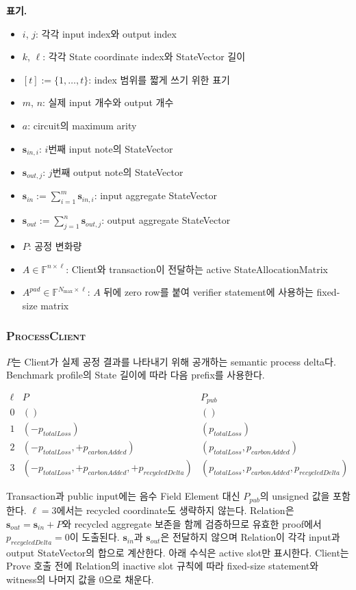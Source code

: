 \documentclass[11pt,a4paper]{extarticle}
\newcommand{\Prove}{\mathrm{Prove}}
\begin{document}
\noindent\textbf{표기.}
\begin{itemize}[nosep]
  \item $i$, $j$: 각각 input index와 output index
  \item $k$, $\ell$: 각각 State coordinate index와 StateVector 길이
  \item $[t]:=\{1,\ldots,t\}$: index 범위를 짧게 쓰기 위한 표기
  \item $m$, $n$: 실제 input 개수와 output 개수
  \item $a$: circuit의 maximum arity
  \item $\mathbf{s}_{in,i}$: $i$번째 input note의 StateVector
  \item $\mathbf{s}_{out,j}$: $j$번째 output note의 StateVector
  \item $\mathbf{s}_{in}:=\sum_{i=1}^{m}\mathbf{s}_{in,i}$: input aggregate StateVector
  \item $\mathbf{s}_{out}:=\sum_{j=1}^{n}\mathbf{s}_{out,j}$: output aggregate StateVector
  \item $P$: 공정 변화량
  \item $A\in\mathbb{F}^{n\times\ell}$: Client와 transaction이 전달하는 active
        StateAllocationMatrix
  \item $A^{pad}\in\mathbb{F}^{N_{\max}\times\ell}$: $A$ 뒤에 zero row를 붙여
        verifier statement에 사용하는 fixed-size matrix
\end{itemize}

\Needspace{0.68\textheight}
\subsubsection{\textsc{ProcessClient}}

$P$는 Client가 실제 공정 결과를 나타내기 위해 공개하는 semantic process delta다.
Benchmark profile의 State 길이에 따라 다음 prefix를 사용한다.

\[
\begin{array}{c|c|c}
\ell & P & P_{pub} \\
\hline
0 & () & () \\
1 & (-p_{totalLoss}) & (p_{totalLoss}) \\
2 & (-p_{totalLoss},+p_{carbonAdded}) & (p_{totalLoss},p_{carbonAdded}) \\
3 & (-p_{totalLoss},+p_{carbonAdded},+p_{recycledDelta}) &
(p_{totalLoss},p_{carbonAdded},p_{recycledDelta})
\end{array}
\]

Transaction과 public input에는 음수 Field Element 대신 $P_{pub}$의 unsigned 값을
포함한다. $\ell=3$에서는 recycled coordinate도 생략하지 않는다. Relation은
$\mathbf{s}_{out}=\mathbf{s}_{in}+P$와 recycled aggregate 보존을 함께 검증하므로
유효한 proof에서 $p_{recycledDelta}=0$이 도출된다.
$\mathbf{s}_{in}$과 $\mathbf{s}_{out}$은 전달하지 않으며 Relation이 각각 input과
output StateVector의 합으로 계산한다.
아래 수식은 active slot만 표시한다. Client는 $\Prove$ 호출 전에 Relation의 inactive
slot 규칙에 따라 fixed-size statement와 witness의 나머지 값을 0으로 채운다.
\end{document}
